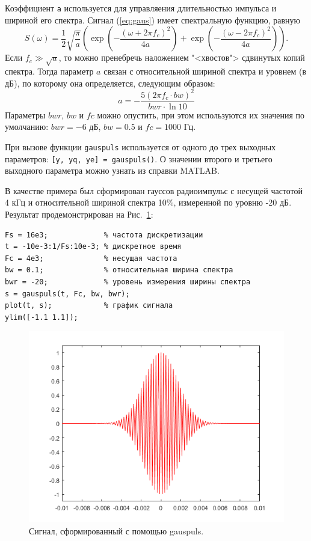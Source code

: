 \documentclass[12pt,a4paper]{article}
\begin{document}
Коэффициент \verb|a| используется для управляения длительностью импульса и шириной его спектра. Сигнал (\ref{eq:gaus}) имеет спектральную функцию, равную
\begin{equation}
  S(\omega) = \frac{1}{2} \sqrt{\frac{\pi}{a}} \left( \exp\left( -\frac{(\omega+2\pi f_c)^2}{4a} \right) + \exp\left( -\frac{(\omega-2\pi f_c)^2}{4a} \right) \right).
\end{equation}
Если $f_c \gg \sqrt{a}$, то можно пренебречь наложением "<хвостов"> сдвинутых копий спектра. Тогда параметр $a$ связан с относительной шириной спектра и уровнем (в дБ), по которому она определяется, следующим образом:
\begin{equation}
  a = -\frac{5(2\pi f_c \cdot bw)^2}{bwr \cdot \ln 10}
\end{equation}
Параметры $bwr$, $bw$ и $fc$ можно опустить, при этом используются их значения по умолчанию: $bwr=-6$ дБ, $bw=0.5$ и $fc=1000$ Гц.

При вызове функции \verb|gauspuls| используется от одного до трех выходных параметров: \verb|[y, yq, ye] = gauspuls()|. О значении второго и третьего выходного параметра можно узнать из справки MATLAB.

В качестве примера был сформирован гауссов радиоимпульс с несущей частотой 4 кГц и относительной шириной спектра 10\%, измеренной по уровню -20 дБ. Результат продемонстрирован на Рис.~\ref{fig:img_gaus}:
\begin{verbatim}
Fs = 16e3;             % частота дискретизации
t = -10e-3:1/Fs:10e-3; % дискретное время
Fc = 4e3;              % несущая частота
bw = 0.1;              % относительная ширина спектра
bwr = -20;             % уровень измерения ширины спектра
s = gauspuls(t, Fc, bw, bwr);
plot(t, s);            % график сигнала
ylim([-1.1 1.1]);
\end{verbatim}
\begin{figure}[!ht]
  \centering
  \includegraphics[width=\linewidth]{img_gaus}
  \caption{Сигнал, сформированный с помощью gauspuls.}
  \label{fig:img_gaus}
\end{figure}
\end{document}

